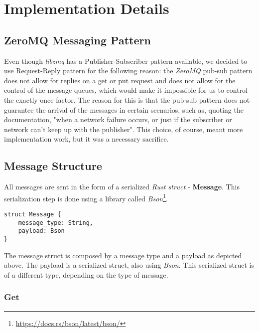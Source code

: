 \section{Implementation Details}
\label{sec:Implementation}

\subsection{ZeroMQ Messaging Pattern}
Even though \emph{libzmq} has a Publisher-Subscriber pattern available, we decided to use Request-Reply pattern for the following reason: the \emph{ZeroMQ} pub-sub pattern does not allow for replies on a get or put request and does not allow for the control of the message queues, which would make it impossible for us to control the exactly once factor. The reason for this is that the pub-sub pattern does not guarantee the arrival of the messages in certain scenarios, such as, quoting the documentation, "when a network failure occurs, or just if the subscriber or network can’t keep up with the publisher"\cite[Chapter~5]{zeromqguide}. This choice, of course, meant more implementation work, but it was a necessary sacrifice.

\subsection{Message Structure}
All messages are sent in the form of a serialized \emph{Rust struct} - \textbf{Message}. This serialization step is done using a library called \emph{Bson}\footnote{\url{https://docs.rs/bson/latest/bson/}}. 

\begin{lstlisting}
struct Message {
    message_type: String,
    payload: Bson
}
\end{lstlisting}

The message struct is composed by a message type and a payload as depicted above. The payload is a serialized struct, also using \emph{Bson}. This serialized struct is of a different type, depending on the type of message. 

\subsubsection{Get}

